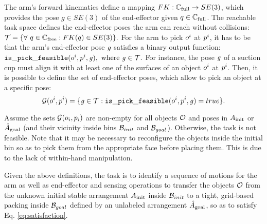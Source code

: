 The arm's forward kinematics define a mapping $FK: \mathbb{C}_{{\rm full}} \rightarrow SE(3)$, which provides the pose $g \in SE(3)$ of the end-effector given $q \in \mathbb{C}_{{\rm full}}$. The reachable task space defines the end-effector poses the arm can reach without collisions: $\mathcal{T} = \{ \forall\ q \in \mathbb{C}_{{\rm free}}: FK(q) \in SE(3)\}.$ For the arm to pick $o^i$ at $p^i$, it has to be that the arm's end-effector pose $\mathit{g}$ satisfies a binary output function: $\mathtt{is\_pick\_feasible}( o^i, p^i, \mathit{g}), \textrm{ where } \mathit{g} \in \mathcal{T}.$ For instance, the pose $\mathit{g}$ of a suction cup must align it with at least one of the surfaces of an object $o^i$ at $p^i$. Then, it is possible to define the set of end-effector poses, which allow to pick an object at a specific pose: $$\mathcal{G}( o^i, p^i ) = \{\mathit{g} \in \mathcal{T}:  {\mathtt{is\_pick\_feasible}}(o^i, p^i, \mathit{g}) = true\}.$$ 

Assume the sets $\mathcal{G}( o_i, p_i )$ are non-empty for all objects $\mathcal{O}$ and poses in $A_{\rm init}$ or $\hat{A}_{\rm goal}$ (and their vicinity inside bins $\mathcal{B}_{init}$ and $\mathcal{B}_{goal}$). Otherwise, the task is not feasible. Note that it may be necessary to reconfigure the objects inside the initial bin so as to pick them from the appropriate face before placing them. This is due to the lack of within-hand manipulation.

Given the above definitions, the task is to identify a sequence of motions for the arm as well as end-effector and sensing operations to transfer the objects  $\mathcal{O}$ from the unknown initial stable arrangement $A_{\rm init}$ inside $\mathcal{B}_{init}$ to a tight, grid-based packing inside $\mathcal{B}_{goal}$ defined by an unlabeled arrangement $\hat{A}_{\rm goal}$, so as to satisfy Eq. \ref{eq:satisfaction}.  